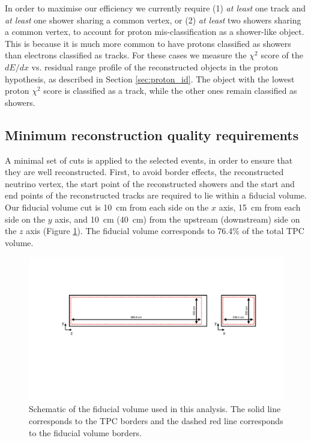 In order to maximise our efficiency we currently require (1) \emph{at least} one track and \emph{at least} one shower sharing a common vertex, or (2) \emph{at least} two showers sharing a common vertex, to account for proton mis-classification as a shower-like object. This is because it is much more common to have protons classified as showers than electrons classified as tracks. For these cases we measure the $\chi^2$ score of the $dE/dx$ vs. residual range profile of the reconstructed objects in the proton hypothesis, as described in Section \ref{sec:proton_id}. The object with the lowest proton $\chi^2$ score is classified as a track, while the other ones remain classified as showers.

\subsection{Minimum reconstruction quality requirements}\label{sec:precuts}
A minimal set of cuts is applied to the selected events, in order to ensure that they are well reconstructed.
First, to avoid border effects, the reconstructed neutrino vertex, the start point of the reconstructed showers and the start and end points of the reconstructed tracks are required to lie within a fiducial volume. Our fiducial volume cut is 10~cm from each side on the $x$ axis, 15~cm from each side on the $y$ axis, and 10~cm (40~cm) from the upstream (downstream) side on the $z$ axis (Figure \ref{fig:fidvol}). The fiducial volume corresponds to 76.4\% of the total TPC volume. 

\begin{figure}
\centering
  \includegraphics[width=0.95\linewidth]{figures/fidvol.pdf}
  \caption{Schematic of the fiducial volume used in this analysis. The solid line corresponds to the TPC borders and the dashed red line corresponds to the fiducial volume borders.}
  \label{fig:fidvol}
\end{figure}

